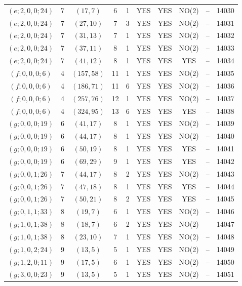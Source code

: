 \begin{longtable}{|c|c|c|c|c|c|c|c|c|c|}
$(e; 2, 0, 0; 24)$ & 7 & $(17, 7)$ & 6 & 1 & YES & YES & NO(2) & -- & 14030\\
$(e; 2, 0, 0; 24)$ & 7 & $(27, 10)$ & 7 & 3 & YES & YES & NO(2) & -- & 14031\\
$(e; 2, 0, 0; 24)$ & 7 & $(31, 13)$ & 7 & 1 & YES & YES & NO(2) & -- & 14032\\
$(e; 2, 0, 0; 24)$ & 7 & $(37, 11)$ & 8 & 1 & YES & YES & NO(2) & -- & 14033\\
$(e; 2, 0, 0; 24)$ & 7 & $(41, 12)$ & 8 & 1 & YES & YES & YES & -- & 14034\\
$(f; 0, 0, 0; 6)$ & 4 & $(157, 58)$ & 11 & 1 & YES & YES & NO(2) & -- & 14035\\
$(f; 0, 0, 0; 6)$ & 4 & $(186, 71)$ & 11 & 6 & YES & YES & NO(2) & -- & 14036\\
$(f; 0, 0, 0; 6)$ & 4 & $(257, 76)$ & 12 & 1 & YES & YES & NO(2) & -- & 14037\\
$(f; 0, 0, 0; 6)$ & 4 & $(324, 95)$ & 13 & 6 & YES & YES & YES & -- & 14038\\
$(g; 0, 0, 0; 19)$ & 6 & $(41, 17)$ & 8 & 1 & YES & YES & NO(2) & -- & 14039\\
$(g; 0, 0, 0; 19)$ & 6 & $(44, 17)$ & 8 & 1 & YES & YES & NO(2) & -- & 14040\\
$(g; 0, 0, 0; 19)$ & 6 & $(50, 19)$ & 8 & 1 & YES & YES & YES & -- & 14041\\
$(g; 0, 0, 0; 19)$ & 6 & $(69, 29)$ & 9 & 1 & YES & YES & YES & -- & 14042\\
$(g; 0, 0, 1; 26)$ & 7 & $(44, 17)$ & 8 & 2 & YES & YES & NO(2) & -- & 14043\\
$(g; 0, 0, 1; 26)$ & 7 & $(47, 18)$ & 8 & 1 & YES & YES & YES & -- & 14044\\
$(g; 0, 0, 1; 26)$ & 7 & $(50, 21)$ & 8 & 2 & YES & YES & YES & -- & 14045\\
$(g; 0, 1, 1; 33)$ & 8 & $(19, 7)$ & 6 & 1 & YES & YES & NO(2) & -- & 14046\\
$(g; 1, 0, 1; 38)$ & 8 & $(18, 7)$ & 6 & 2 & YES & YES & NO(2) & -- & 14047\\
$(g; 1, 0, 1; 38)$ & 8 & $(23, 10)$ & 7 & 1 & YES & YES & NO(2) & -- & 14048\\
$(g; 1, 0, 2; 24)$ & 9 & $(13, 5)$ & 5 & 1 & YES & YES & NO(2) & -- & 14049\\
$(g; 1, 2, 0; 11)$ & 9 & $(17, 5)$ & 6 & 1 & YES & YES & NO(2) & -- & 14050\\
$(g; 3, 0, 0; 23)$ & 9 & $(13, 5)$ & 5 & 1 & YES & YES & NO(2) & -- & 14051\\

\end{longtable}
